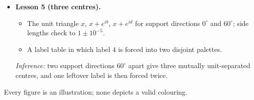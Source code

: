 \documentclass[11pt]{article}
\theoremstyle{definition}
\theoremstyle{remark}
\begin{document}
\begin{itemize}
\begin{itemize}
  \item Two segments $40^\circ$ apart whose straddle regions overlap in a long thin band where only labels $5,6$ could appear.
  \end{itemize}
  Checks: 0 misclassified points among 153,768 and 151,176 checked; every straddling point lies within $L$ of the unit circle. \emph{Inference:} a narrow cone of interfaces leaves a long region for the leftover labels; CC60 says at least three must survive.
\item \textbf{Lesson 5 (three centres).}
  \begin{itemize}
  \item The unit triangle $x$, $x+e^{ib}$, $x+e^{id}$ for support directions $0^\circ$ and $60^\circ$; side lengths check to $1\pm10^{-5}$.
  \item A label table in which label $4$ is forced into two disjoint palettes.
  \end{itemize}
  \emph{Inference:} two support directions $60^\circ$ apart give three mutually unit-separated centres, and one leftover label is then forced twice.
\end{itemize}
Every figure is an illustration; none depicts a valid colouring.

\end{document}
